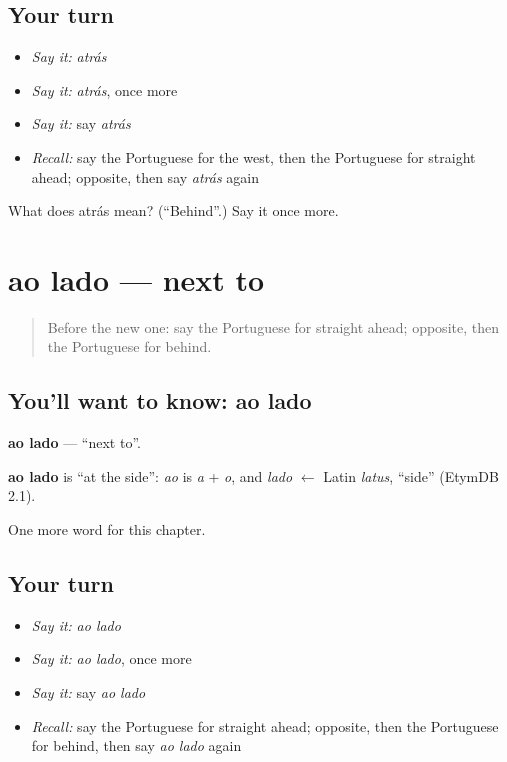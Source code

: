 \subsection*{Your turn}
\begin{itemize}
\raggedright
  \item \emph{Say it:} \emph{atrás}
  \item \emph{Say it:} \emph{atrás}, once more
  \item \emph{Say it:} say \emph{atrás}
  \item \emph{Recall:} say the Portuguese for the west, then the Portuguese for straight ahead; opposite, then say \emph{atrás} again
\end{itemize}

\begin{tcolorbox}[breakable,colback=teal!4,colframe=teal!35!black,title={Before you move on}]
What does atrás mean? (\textquotedblleft{}Behind\textquotedblright{}.) Say it once more.
\end{tcolorbox}
\section[ao lado]{ao lado — next to}

\label{lesson:PT-C89-ao-lado}



\begin{quote}
Before the new one: say the Portuguese for straight ahead; opposite, then the Portuguese for behind.
\end{quote}

\subsection*{You'll want to know: ao lado}
\textbf{ao lado} — \textquotedblleft{}next to\textquotedblright{}.

\begin{cousinweb}
\textbf{ao lado} is \textquotedblleft{}at the side\textquotedblright{}: \emph{ao} is \emph{a} + \emph{o}, and \emph{lado} $\leftarrow$ Latin \emph{latus}, \textquotedblleft{}side\textquotedblright{} (EtymDB 2.1).
\end{cousinweb}

\begin{grammarlens}[title={What you've built}]
One more word for this chapter.
\end{grammarlens}

\subsection*{Your turn}
\begin{itemize}
\raggedright
  \item \emph{Say it:} \emph{ao lado}
  \item \emph{Say it:} \emph{ao lado}, once more
  \item \emph{Say it:} say \emph{ao lado}
  \item \emph{Recall:} say the Portuguese for straight ahead; opposite, then the Portuguese for behind, then say \emph{ao lado} again
\end{itemize}

